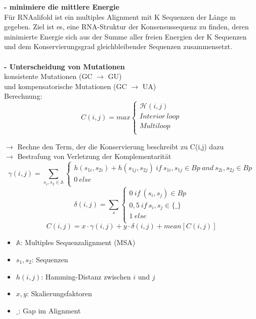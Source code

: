 \textbf{- minimiere die mittlere Energie} \\
Für RNAalifold ist ein multiples Alignment mit K Sequenzen der Länge m gegeben. Ziel ist es, eine RNA-Struktur der Konsensussequenz zu finden, deren minimierte Energie sich aus der Summe aller freien Energien der K Sequenzen und dem Konservierungsgrad gleichbleibender Sequenzen zusammensetzt.\\
\\
\textbf{- Unterscheidung von Mutationen} \\
konsistente Mutationen (GC $\rightarrow$ GU) \\
und kompensatorische Mutationen (GC $\rightarrow$ UA) \\ 

Berechnung:
\begin{equation}
C(i,j)= max
\begin{cases} 
\mathcal{H}(i,j)\\ 
Interior~loop\\ 
Multiloop\\
\end{cases}
\end{equation}

$\rightarrow$  Rechne den Term, der die Konservierung beschreibt zu C(i,j) dazu \\
$\rightarrow$ Bestrafung von Verletzung der Komplementarität\\
	\begin{equation}
	\gamma(i,j)= \sum_{s_1,s_2 \in \mathbb{A}} 
	\begin{cases} 
	h(s_{1i},s_{2i}) + h(s_{1j},s_{2j}) \ if\ s_{1i},s_{1j} \in Bp \ and \ s_{2i},s_{2j} \in Bp \\
	0 \ else\\
	\end{cases} 
	\end{equation}
	\begin{equation}	 
		\delta(i,j)= \sum_{s} 
		\begin{cases} 
			0 \ if\ (s_{i},s_{j}) \in Bp \\
			0,5 \ if\ s_{i}, s_{j} \in \{\_\} \\ 
			1 \ else\\
		\end{cases}
	\end{equation}
	\begin{equation} 
		C(i,j)= x \cdot \gamma (i,j) + y \cdot \delta (i,j)+ mean[C(i,j)]  
	\end{equation}
\begin{itemize}
 \item[] $\mathbb{A}$: Multiples Sequenzalignment (MSA)
 \item[] $s_1, s_2$: Sequenzen
 \item[] $h(i,j)$: Hamming-Distanz zwischen $i$ und $j$
 \item[] $x,y$: Skalierungsfaktoren
 \item[] $\_$: Gap im Alignment
\end{itemize}

